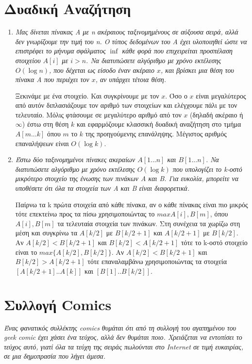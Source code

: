 \documentclass[a4paper,10pt]{article} \usepackage{anysize}
\begin{document}
\section{Δυαδική Αναζήτηση}
\begin{enumerate}
\item \textit{Μας δίνεται πίνακας Α με n ακέραιους ταξινομημένους σε αύξουσα
σειρά, αλλά \emph{δεν γνωρίζουμε την τιμή του n}. Ο τύπος δεδομένων του Α έχει
υλοποιηθεί ώστε να επιστρέφει το μήνυμα σφάλματος $\inf$ κάθε φορά που
επιχειρείται προσπέλαση στοιχείου $A[i]$ με $i > n$. Να διατυπώσετε αλγόριθμο
με χρόνο εκτέλεσης $O(\log{n})$, που δέχεται ως είσοδο έναν ακέραιο $x$, και
βρίσκει μια θέση του πίνακα Α που περιέχει τον $x$, αν υπάρχει τέτοια θέση.}

Ξεκινάμε με ένα στοιχείο. Και συγκρίνουμε με τον $x$. Όσο ο $x$ είναι
μεγαλύτερος από αυτόν διπλασιάζουμε τον αριθμό των στοιχείων και ελέγχουμε
πάλι με τον τελευταίο. Μόλις φτάσουμε σε μεγαλύτερο αριθμό από τον $x$
(δηλαδή ακέραιο ή $\infty$) έστω στη θέση $k$ και εφαρμόζουμε κλασσική δυαδική αναζήτηση στο τμήμα $A[m...k]$
όπου $m$ το $k$ της προηγούμενης επανάληψης. 
Μέγιστος αριθμός επαναλήψεων είναι $O(\log{k})$.
\item \textit{Έστω δύο ταξινομημένοι πίνακες ακεραίων $A[1...n]$ και
$B[1...n]$. Να διατυπώσετε αλγόριθμο με χρόνο εκτέλεσης $O(\log{k})$ που
υπολογίζει το k-οστό μικρότερο στοιχείο της ένωσης των πινάκων Α και Β. Για
ευκολία, μπορείτε να υποθέσετε ότι όλα τα στοιχεία των Α και Β είναι
διαφορετικά.}

Παίρνω τα k πρώτα στοιχεία από κάθε πίνακα, αν ο κάθε πίνακας είναι πιο μικρός
τότε επεκτείνω προς τα πίσω χρησιμοποιώντας το $max{A[i],B[m]}$, όπου
$A[i],B[m]$ τα τελευταία στοιχεία των πινάκων. Στη συνέχεια τα χωρίζω στη μέση και
συγκρίνω τα $A[k/2]$ με $B[k/2+1]$ και $A[k/2+1]$ με $B[k/2]$. Αν
$A[k/2]<B[k/2+1]$ και $B[k/2]<A[k/2+1]$ τότε το k-οστό στοιχείο είναι το
$max\{A[k/2],B[k/2]\}$. Αν $A[k/2]<B[k/2+1]$ και $B[k/2]>A[k/2+1]$ τότε
επαναλαμβάνω χρησιμοποιώντας τα στοιχεία $[A[k/2+1]..A[k]]$ και
$[B[1]..B[k/2]]$.
\end{enumerate}
\pagebreak
\section{Συλλογή Comics}
\textit{Ένας φανατικός συλλέκτης comics θυμάται ότι από τη συλλογή του
αγαπημένου του geek comic έχει χάσει ένα τεύχος, αλλά δεν θυμάται ποιο.
Χρειάζεται να εντοπίσει το τεύχος αυτό, γιατί όλα τα τεύχη της σειράς
πωλούνται στο Internet σε τιμή ευκαιρίας, σε μια δημοπρασία που λήγει άμεσα.}
\end{document}
